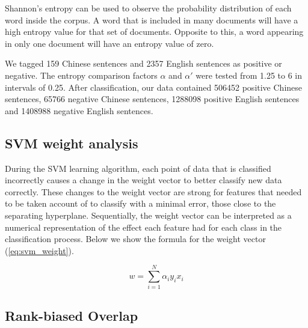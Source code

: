 Shannon’s entropy can be used to observe the probability distribution of each word inside the corpus. A word that is included in many documents will have a high entropy value for that set of documents. Opposite to this, a word appearing in only one document will have an entropy value of zero. 

We tagged 159 Chinese sentences and \num[group-separator={,}]{2357} English sentences as positive or negative. The entropy comparison factors \(\alpha\) and \(\alpha'\) were tested from 1.25 to 6 in intervals of 0.25. After classification, our data contained \num[group-separator={,}]{506452} positive Chinese sentences, \num[group-separator={,}]{65766} negative Chinese sentences, \num[group-separator={,}]{1288098} positive English sentences and \num[group-separator={,}]{1408988} negative English sentences. 

\subsection{SVM weight analysis}\label{svmweightsanalysis}

During the SVM learning algorithm, each point of data that is classified incorrectly causes a change in the weight vector to better classify new data correctly. These changes to the weight vector are strong for features that needed to be taken account of to classify with a minimal error, those close to the separating hyperplane. Sequentially, the weight vector can be interpreted as a numerical representation of the effect each feature had for each class in the classification process. Below we show the formula for the weight vector (\ref{eq:svm_weight}).

\begin{equation}\label{eq:svm_weight}
w = \sum_{i=1}^N \alpha_i y_i x_i
\end{equation}

\subsection{Rank-biased Overlap}\label{rbo}

